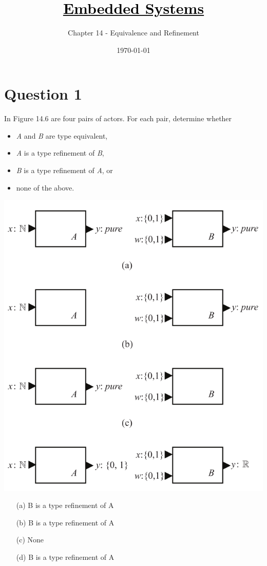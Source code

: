 \documentclass[12pt]{article}
\title{\href{https://github.com/M-Sc-AUT/M.Sc-Computer-Architecture/tree/main/Embedded Systems Modeling and Design}{\textcolor{black}{Embedded Systems}}}
\subtitle{Chapter 14 - Equivalence and Refinement}
\date{\today}
\begin{document}
\maketitlepage
\maketitlestart







\section{Question 1}
In Figure 14.6 are four pairs of actors. For each pair, determine whether

\begin{itemize}
	\item \textit{A} and \textit{B} are type equivalent,
	\item \textit{A} is a type refinement of \textit{B},
	\item \textit{B} is a type refinement of \textit{A}, or
	\item none of the above.
\end{itemize}

\begin{center}
	\includegraphics*[width=0.6\linewidth]{images/img1}
\end{center}


\begin{qsolve}
	\begin{enumerate}
		\item [(a)] B is a type refinement of A
		\item [(b)] B is a type refinement of A
		\item [(c)] None
		\item [(d)] B is a type refinement of A
	\end{enumerate}
	
\end{qsolve}
\vfil
\clearpage
\end{document}
